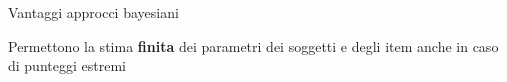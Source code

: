\documentclass[
  ignorenonframetext,
]{beamer}
\begin{document}
\begin{frame}{}
\protect\hypertarget{section-7}{}
\begin{exampleblock}{Vantaggi approcci bayesiani}

\vspace{3mm}
Permettono la stima \textbf{finita} dei parametri dei soggetti e degli item anche in caso di punteggi estremi

\end{exampleblock}
\end{frame}
\end{document}
